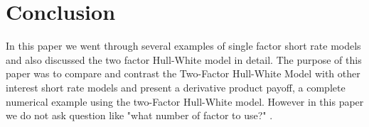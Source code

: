 \documentclass{article}
\begin{document}
\section{Conclusion}

In this paper we went through several examples of single factor short rate models and also discussed the two factor Hull-White model in detail.   The purpose of this paper was to compare and contrast the Two-Factor Hull-White Model with other interest short rate models and present a derivative product payoff,  a complete numerical example using the two-Factor Hull-White model.  However in this paper we do not ask question like "what number of factor to use?" .

\newpage
\section*{} \label{bibsection}
\end{document}
